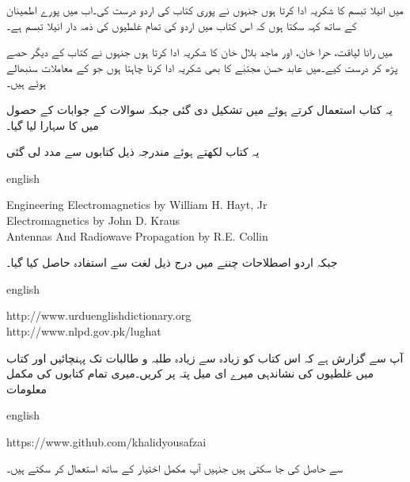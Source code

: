 میں  انیلا تبسم کا شکریہ ادا کرتا ہوں جنہوں نے پوری کتاب کی اردو درست کی۔اب میں پورے اطمینان کے ساتھ کہہ سکتا ہوں کہ اس کتاب میں اردو کی  تمام غلطیوں کی ذمہ دار انیلا تبسم ہے۔

میں رانا لیاقت، حرا خان،  اور ماجد بلال خان کا شکریہ ادا کرتا ہوں جنہوں نے کتاب کے دیگر حصے پڑھ کر درست کیے۔میں عابد حسن مجتبٰے کا بھی شکریہ ادا کرنا چاہتا ہوں جو  کے معاملات سنبھالے ہوئے ہیں۔

یہ کتاب  استعمال کرتے ہوئے  میں تشکیل دی گئی جبکہ سوالات کے جوابات کے حصول میں  کا سہارا لیا گیا۔

یہ کتاب لکھتے ہوئے مندرجہ ذیل کتابوں سے مدد لی گئی

{
\begin{otherlanguage*}{english}
\begin{LTR}
Engineering Electromagnetics by William H. Hayt, Jr\\
Electromagnetics by John D. Kraus\\
Antennas And Radiowave Propagation by R.E. Collin
\end{LTR}
\end{otherlanguage*}
}

جبکہ اردو اصطلاحات چننے میں درج ذیل لغت سے استفادہ حاصل کیا گیا۔

{
\begin{otherlanguage*}{english}
\begin{LTR}
http:/\!\!/www.urduenglishdictionary.org\\
http:/\!\!/www.nlpd.gov.pk/lughat
\end{LTR}
\end{otherlanguage*}
}

آپ سے گزارش ہے کہ اس کتاب کو زیادہ سے زیادہ طلبہ و طالبات تک پہنچائیں اور کتاب میں غلطیوں کی نشاندہی میرے  ای میل پتہ پر کریں۔میری تمام کتابوں کی مکمل  معلومات

{
\begin{otherlanguage*}{english}
\begin{LTR}
https:/\!\!/www.github.com/khalidyousafzai
\end{LTR}
\end{otherlanguage*}
}

سے حاصل کی جا سکتی ہیں جنہیں آپ مکمل اختیار کے ساتھ استعمال کر سکتے ہیں۔
\vspace{5mm}

{}


